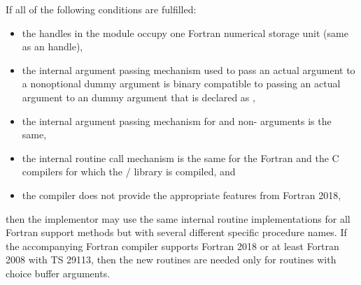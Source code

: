 \begin{implementors}
If all of the following conditions are fulfilled:
\begin{itemize}
\item the handles in the  module occupy one Fortran
   numerical storage unit (same as an  handle),
\item the internal argument passing mechanism used to pass an actual 
   argument to a nonoptional  dummy argument is binary
   compatible to passing an actual  argument to an 
   dummy argument that is declared as ,
\item the internal argument passing mechanism for  and
   non- arguments is the same,
\item the internal routine call mechanism is the same for
   the Fortran and the C compilers for which the \MPI/ library is compiled, and
\item the compiler does not provide the appropriate features from Fortran 2018,
\end{itemize}
then the implementor may use the same
internal routine implementations for all Fortran support
methods but with several different specific procedure names.
If the accompanying Fortran compiler supports Fortran 2018 or at least Fortran 2008 with TS 29113,
then the new routines are needed only for routines with
choice buffer arguments.
\end{implementors}

